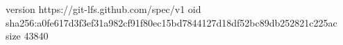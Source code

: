 version https://git-lfs.github.com/spec/v1
oid sha256:a0fe617d3f3ef31a982cf91f80ec15bd7844127d18df52bc89db252821c225ac
size 43840
